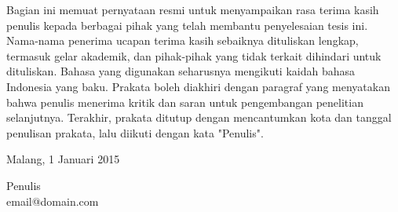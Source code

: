 \newpage
{}
\vspace{10mm}
\normalsize
\justifying

Bagian ini memuat pernyataan resmi untuk menyampaikan rasa terima kasih penulis kepada berbagai pihak yang telah membantu penyelesaian tesis ini. 
Nama-nama penerima ucapan terima kasih sebaiknya dituliskan lengkap, termasuk gelar akademik, dan pihak-pihak yang tidak terkait dihindari untuk dituliskan. 
Bahasa yang digunakan seharusnya mengikuti kaidah bahasa Indonesia yang baku. 
Prakata boleh diakhiri dengan paragraf yang menyatakan bahwa penulis menerima kritik dan saran untuk pengembangan penelitian selanjutnya. 
Terakhir, prakata ditutup dengan mencantumkan kota dan tanggal penulisan prakata, lalu diikuti dengan kata "Penulis".

\vspace{10mm}
\hfill\begin{minipage}{\dimexpr\textwidth-9cm}
  Malang, 1 Januari 2015

  \vspace{10mm}
  Penulis \\
  email@domain.com
  \xdef\tpd{0}
\end{minipage}

